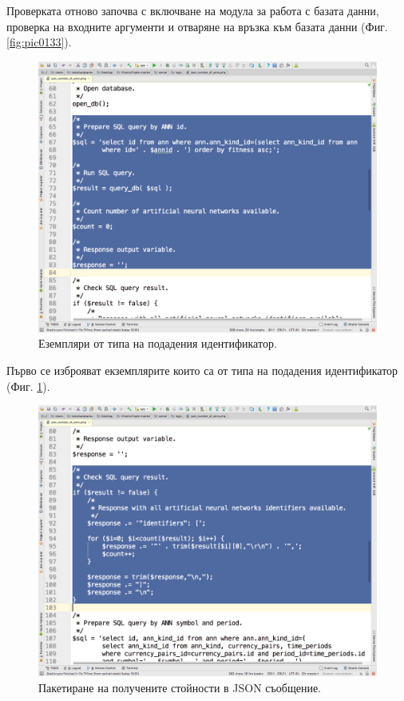 \documentclass[book,14pt,oneside,openany]{memoir}
\begin{document}
Проверката отново започва с включване на модула за работа с базата данни, проверка на входните аргументи и отваряне на връзка към базата данни (Фиг. \ref{fig:pic0133}).

\begin{figure}[h]
  \centering
  \includegraphics[height=0.45\pdfpageheight]{pic0134}
  \caption{Еземпляри от типа на подадения идентификатор.}
\label{fig:pic0134}
\end{figure}
\FloatBarrier

Първо се изброяват екземплярите които са от типа на подадения идентификатор (Фиг. \ref{fig:pic0134}).

\begin{figure}[h]
  \centering
  \includegraphics[height=0.45\pdfpageheight]{pic0135}
  \caption{Пакетиране на получените стойности в JSON съобщение.}
\label{fig:pic0135}
\end{figure}
\FloatBarrier
\end{document}
